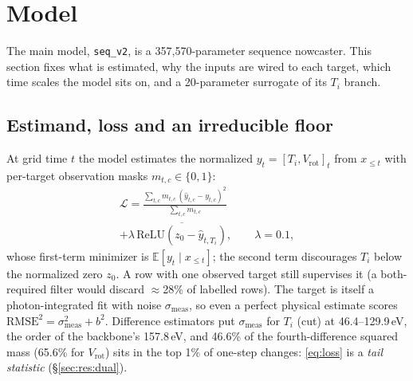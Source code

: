 \documentclass[10pt,twocolumn,letterpaper]{article}
\newcommand{\Ti}{\ensuremath{T_i}}
\newcommand{\Vrot}{\ensuremath{V_\mathrm{rot}}}
\newcommand{\seqv}{\texttt{seq\_v2}}
\begin{document}
\section{Model}
\label{sec:model}

The main model, \seqv{}, is a 357{,}570-parameter sequence nowcaster. This
section fixes what is estimated, why the inputs are wired to each target, which time
scales the model sits on, and a 20-parameter surrogate of its \Ti{} branch.

\subsection{Estimand, loss and an irreducible floor}
\label{sec:model:target}
At grid time $t$ the model estimates the normalized $y_t=[\Ti,\Vrot]_t$ from
$x_{\le t}$ with per-target observation masks $m_{t,c}\in\{0,1\}$:
\begin{multline}
  \mathcal{L}
  = \frac{\sum_{t,c} m_{t,c}\,(\hat y_{t,c}-y_{t,c})^2}{\sum_{t,c} m_{t,c}}\\
  + \lambda\,\overline{\mathrm{ReLU}(z_0-\hat y_{t,\Ti})},\qquad \lambda = 0.1,
  \label{eq:loss}
\end{multline}
whose first-term minimizer is $\mathbb{E}[y_t\mid x_{\le t}]$; the second term
discourages \Ti{} below the normalized zero $z_0$. A row with one observed target
still supervises it (a both-required filter would discard $\approx$28\% of labelled
rows). The target is itself a photon-integrated fit with noise $\sigma_\mathrm{meas}$,
so even a perfect physical estimate scores
$\mathrm{RMSE}^2=\sigma_\mathrm{meas}^2+b^2$. Difference estimators put
$\sigma_\mathrm{meas}$ for \Ti{} (cut) at 46.4--129.9\,eV, the order of the backbone's
157.8\,eV, and 46.6\% of the fourth-difference squared mass (65.6\% for \Vrot{}) sits
in the top 1\% of one-step changes: \eqref{eq:loss} is a \emph{tail statistic}
(\S\ref{sec:res:dual}).
\end{document}
